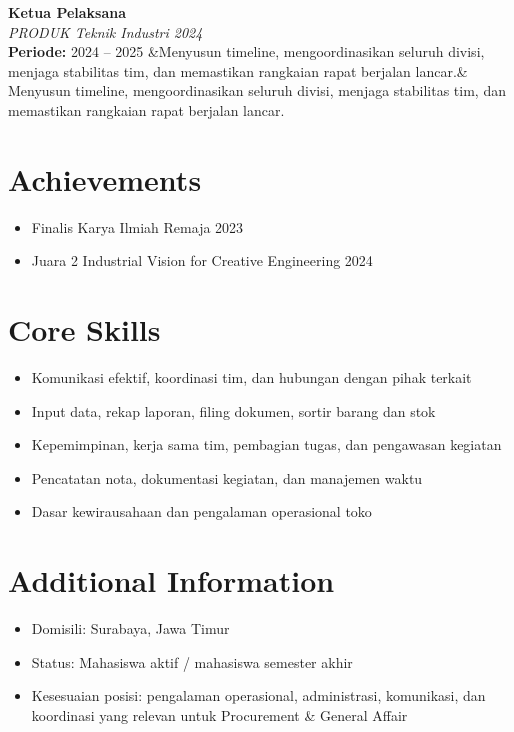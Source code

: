 \documentclass[a4paper,10pt]{article}
\newcommand{\cventry}[4]{%
  \noindent\textbf{#1} \\
  \textit{#2} \\
  \textbf{Periode:} #3
  \ifx&#4& \else \\ \small #4 \fi
  \vspace{6pt}
}
\begin{document}
\cventry
  {Ketua Pelaksana}
  {PRODUK Teknik Industri 2024}
  {2024 -- 2025}
  {Menyusun timeline, mengoordinasikan seluruh divisi, menjaga stabilitas tim, dan memastikan rangkaian rapat berjalan lancar.}

\section{Achievements}
\begin{itemize}
  \item Finalis Karya Ilmiah Remaja 2023
  \item Juara 2 Industrial Vision for Creative Engineering 2024
\end{itemize}

\section{Core Skills}
\begin{itemize}
  \item Komunikasi efektif, koordinasi tim, dan hubungan dengan pihak terkait
  \item Input data, rekap laporan, filing dokumen, sortir barang dan stok
  \item Kepemimpinan, kerja sama tim, pembagian tugas, dan pengawasan kegiatan
  \item Pencatatan nota, dokumentasi kegiatan, dan manajemen waktu
  \item Dasar kewirausahaan dan pengalaman operasional toko
\end{itemize}

\section{Additional Information}
\begin{itemize}
  \item Domisili: Surabaya, Jawa Timur
  \item Status: Mahasiswa aktif / mahasiswa semester akhir
  \item Kesesuaian posisi: pengalaman operasional, administrasi, komunikasi, dan koordinasi yang relevan untuk Procurement \& General Affair
\end{itemize}
\end{document}
